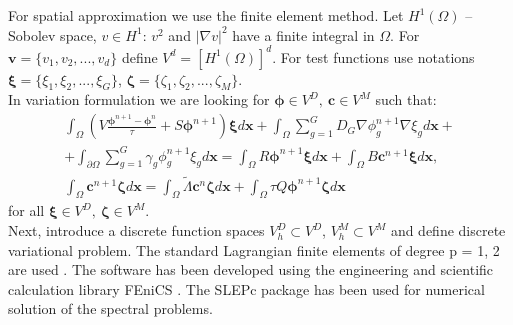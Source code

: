 \documentclass{aip-cp}
\begin{document}
For spatial approximation we use the finite element method\cite{quarteroni}.
Let $H^1(\Omega)$ -- Sobolev space, $v \in H^1$: $v^2$ and $\vert\nabla v\vert^2$ have a finite integral in $\Omega$. For $\bm v = \{v_1, v_2, ..., v_d\}$ define $V^d = [H^1(\Omega)]^d$. For test functions use notations $\bm \xi  = \{\xi_1, \xi_2, ..., \xi_G\}$, $\bm \zeta  = \{\zeta_1, \zeta_2, ..., \zeta_M\}$.\\
In variation formulation we are looking for $\bm \phi \in V^D, \ \bm c \in V^M$ such that:
\begin{eqnarray*}
\int_\Omega \left (V \frac{\bm\phi^{n+1}-\bm\phi^n}{\tau} + S
\bm \phi^{n+1} \right )\bm \xi  d\bm x 
+ \int_{\Omega} \sum_{g=1}^{G} D_G \nabla \phi^{n+1}_g \nabla  \xi_g d\bm x + \\
+ \int_{\partial \Omega} \sum_{g=1}^{G} \gamma_g \phi^{n+1}_g \xi_g d\bm x
= \int_\Omega R \bm \phi^{n+1}\bm \xi d\bm x + \int_\Omega B\bm c^{n+1}\bm \xi d\bm x,
\\
\int_\Omega \bm{c}^{n+1}\bm \zeta d\bm x = \int_\Omega \widetilde{\Lambda}\bm{c}^{n}\bm \zeta  d\bm x + \int_\Omega \tau Q \bm{\phi}^{n+1}\bm \zeta  d\bm x
\end{eqnarray*}
for all $\bm \xi  \in V^D, \ \bm \zeta  \in V^M$.
\\
Next, introduce a discrete function spaces $V_h^D \subset V^D$, $V_h^M \subset V^M$ and define discrete variational problem. The standard Lagrangian finite elements of degree p =
1, 2 are used \cite{brenner}. The software has been developed using the engineering and scientific calculation library FEniCS \cite{fenics}. The SLEPc package has been used for numerical solution of the spectral problems.
\end{document}
